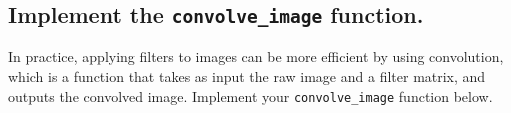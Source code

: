 \documentclass[11pt]{article}
\begin{document}
    \begin{center}
    \end{center}
    { \hspace*{\fill} \\}
    
    \subsection{\texorpdfstring{Implement the \texttt{convolve\_image}
function.}{Implement the convolve\_image function.}}\label{implement-the-convolve_image-function.}

In practice, applying filters to images can be more efficient by using
convolution, which is a function that takes as input the raw image and a
filter matrix, and outputs the convolved image. Implement your
\texttt{convolve\_image} function below.
\end{document}
